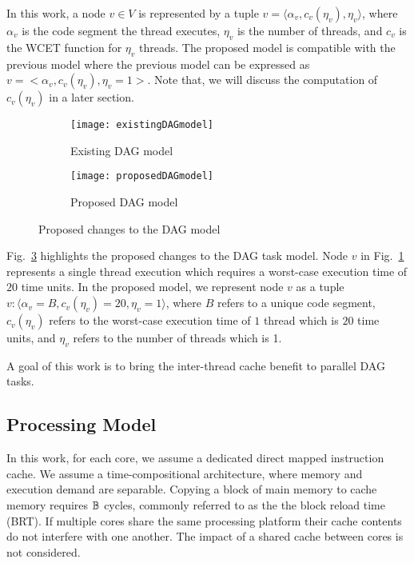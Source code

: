 In this work, a node ${v \in V}$ is represented by a tuple ${v = \langle \alpha_{v}, c_{v}(\eta_{v}), \eta_{v} \rangle }$, where $\alpha_{v}$ is the code segment the thread executes, $\eta_{v}$ is the number of threads, and ${c_{v}}$ is the WCET function for ${\eta_v}$ threads. The proposed model is  compatible with the previous model \cite{li2014analysis} where the previous model can be expressed as ${v = <\alpha_{v}, c_{v}(\eta_v), \eta_v=1>}$. Note that, we will discuss the computation of $c_{v}(\eta_{v})$ in a later section.

\begin{figure}
  \centering
  \begin{subfigure}[b]{0.4\textwidth}{
      \texttt{[image: existingDAGmodel]}
      \caption{Existing DAG model}
      \label{fig:existingDAGmodel}
    }
  \end{subfigure} \quad
  \begin{subfigure}[b]{0.4\textwidth}{
      \texttt{[image: proposedDAGmodel]}
      \caption{Proposed DAG model}
      \label{fig:proposedDAGmodel}
    }
  \end{subfigure}
  \caption{Proposed changes to the DAG model}
  \label{fig:dag-change}
\end{figure}


Fig.~\ref{fig:dag-change} highlights the proposed changes to the DAG task model.  Node $v$ in Fig.~\ref{fig:existingDAGmodel} represents a single thread execution which requires a worst-case execution time of $20$ time units. In the proposed model, we represent node $v$ as a tuple $v : \langle \alpha_v = B, c_v(\eta_v) = 20,  \eta_v = 1\rangle$, where $B$ refers to a unique code segment, $ c_v(\eta_v)$ refers to the worst-case execution time of $1$ thread which is $20$ time units, and $\eta_v$ refers to the number of threads which is 1.

 A goal of this work is to bring the inter-thread cache benefit \addcite to parallel DAG tasks. 

\subsection{Processing Model}

In this work, for each core, we assume a dedicated direct mapped
instruction cache. We assume a time-compositional architecture\addcite,
where memory and execution demand are separable. Copying a block of 
main memory to cache memory requires $\mathbb{B}$ cycles, commonly
referred to as the the block reload time (BRT). If multiple cores share
the same processing platform their cache contents do not interfere with
one another. The impact of a shared cache between cores is not considered.


